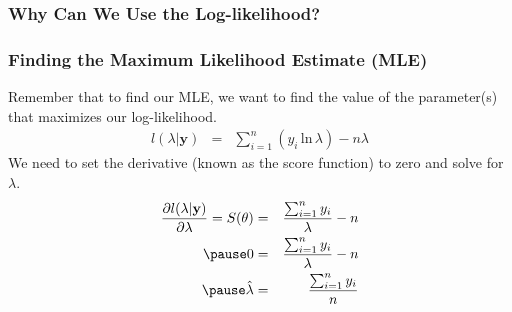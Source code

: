 \documentclass{beamer}
\begin{document}
\begin{frame}
\frametitle{Why Can We Use the Log-likelihood?}
\pause


\begin{figure}
\begin{center}
\end{center}
\end{figure}
\end{frame}

\begin{frame}
\frametitle{Finding the Maximum Likelihood Estimate (MLE)}
\pause
Remember that to find our MLE, we want to find the value of the
parameter(s) that maximizes our log-likelihood.
\pause
\begin{eqnarray*}
l(\lambda | \mathbf{y}) &=& \sum_{i=1}^n (y_i \, \mathrm{ln} \, \lambda)
- n\lambda 
\end{eqnarray*}
\pause
We need to set the derivative (known as the score function) to zero and solve for $\lambda$.
\pause
\begin{eqnarray*}
\frac{\partial l(\lambda | \mathbf{y}) }{\partial \lambda} = S(\theta)
&=& \frac{\sum_{i=1}^n y_i}{\lambda} - n \\
\pause
0 &=& \frac{\sum_{i=1}^n y_i}{\lambda} - n \\
\pause
\hat{\lambda} &=& \frac{\sum_{i=1}^n y_i}{n}
\end{eqnarray*}
\end{frame}
\end{document}
